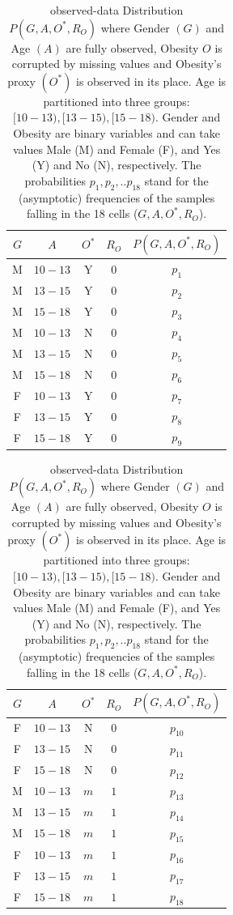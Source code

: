 \documentclass[12pt]{article}
\begin{document}
\begin{table}[h]
	\caption{observed-data Distribution $P(G,A,O^*,R_O)$ where Gender $(G)$ and Age $(A)$ are fully observed, Obesity $O$ is corrupted by missing values and Obesity's  proxy $(O^*)$ is observed in its place. Age is partitioned into three groups:  $[10-13), [13-15), [15-18)$. Gender and Obesity are binary variables and can take values Male (M) and Female (F), and Yes (Y) and No (N), respectively. The probabilities $p_1, p_2,..p_{18}$ stand for the (asymptotic) frequencies of the samples falling in the 18 cells ($G, A, O^*, R_O $). } 	
\begin{minipage}[t]{.45\textwidth}
	\begin{tabular}{|c|c|c|c|c|}
		\hline
		$G$  & $A$  & $O^*$ & $R_O$ & $P(G,A,O^*,R_O)$ \\
		\hline
		M & $10-13$ & Y & $0$ & $p_1$\\
		M & $13-15$ & Y & $0$ & $p_2$\\
		M & $15-18$ & Y & $0$ & $p_3$\\
		M & $10-13$ & N & $0$ & $p_4$\\
		M & $13-15$ & N & $0$ & $p_5$\\
		M & $15-18$ & N & $0$ & $p_6$\\
		F & $10-13$ & Y & $0$ & $p_7$\\
		F & $13-15$ & Y & $0$ & $p_8$\\
		F & $15-18$ & Y & $0$ & $p_9$\\
		\hline
	\end{tabular}
\end{minipage}
\hfill
\noindent
\begin{minipage}[t]{.45\textwidth}
\begin{tabular}{|c|c|c|c|c|}
	\hline
	$G$  & $A$  & $O^*$ & $R_O$ & $P(G,A,O^*,R_O)$ \\
	\hline
	F & $10-13$ & N & $0$ & $p_{10}$\\
	F & $13-15$ & N & $0$ & $p_{11}$\\
	F & $15-18$ & N & $0$ & $p_{12}$\\
	M & $10-13$ & $m$ & $1$ & $p_{13}$\\
	M & $13-15$ & $m$ & $1$ & $p_{14}$\\
	M & $15-18$ & $m$ & $1$ & $p_{15}$\\
	F & $10-13$ & $m$ & $1$ & $p_{16}$\\
	F & $13-15$ & $m$ & $1$ & $p_{17}$\\
	F & $15-18$ & $m$ & $1$ & $p_{18}$\\
			\hline
	\end{tabular}	
\end{minipage}
\label{tab:mardata}
\end{table}
\end{document}
